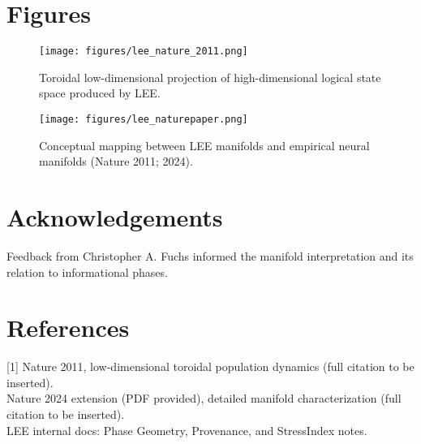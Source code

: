 \documentclass[11pt]{article}
\begin{document}
\section{Figures}
\begin{figure}[H]\centering
\texttt{[image: figures/lee\_nature\_2011.png]}
\caption{Toroidal low-dimensional projection of high-dimensional logical state space produced by LEE.}
\end{figure}

\begin{figure}[H]\centering
\texttt{[image: figures/lee\_naturepaper.png]}
\caption{Conceptual mapping between LEE manifolds and empirical neural manifolds (Nature 2011; 2024).}
\end{figure}

\section*{Acknowledgements}
Feedback from Christopher A. Fuchs informed the manifold interpretation and its relation to informational phases.

\section*{References}
{\small
[1] Nature 2011, low-dimensional toroidal population dynamics (full citation to be inserted).\\
[2] Nature 2024 extension (PDF provided), detailed manifold characterization (full citation to be inserted).\\
[3] LEE internal docs: Phase Geometry, Provenance, and StressIndex notes.
}
\end{document}
